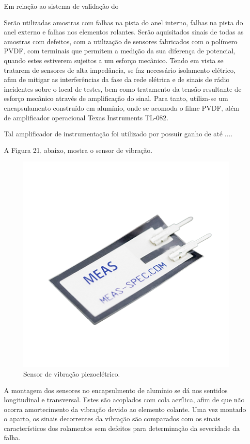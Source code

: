 \documentclass[
	12pt,				
	oneside,			
	a4paper,			
	english,			
	brazil				
	]{abntex2ppgsi}
\begin{document}
Em relação ao sistema de validação do 

Serão utilizadas amostras com falhas na pista do anel interno, falhas na pista do anel externo e falhas nos elementos rolantes. Serão aquisitados sinais de todas as amostras com defeitos, com a utilização de sensores fabricados com o polímero PVDF, com terminais que permitem a medição da sua diferença de potencial, quando estes estiverem sujeitos a um esforço mecânico. Tendo em vista se tratarem de sensores de alta impedância, se faz necessário isolamento elétrico, afim de mitigar as interferências da fase da rede elétrica e de sinais de rádio incidentes sobre o local de testes, bem como tratamento da tensão resultante de esforço mecânico através de amplificação do sinal. Para tanto, utiliza-se um encapsulamento construído em alumínio, onde se acomoda o filme PVDF, além de amplificador operacional Texas Instruments TL-082. 

Tal amplificador de instrumentação foi utilizado por possuir ganho de até .... 

A Figura 21, abaixo, mostra o sensor de vibração. 

\begin{figure}[!htb]
\centering
\includegraphics{Figura21}
\caption {Sensor de vibração piezoelétrico.}
\label{Figura21}
\end{figure} 

A montagem dos sensores no encapsulmento de alumínio se dá nos sentidos longitudinal e transversal. Estes são acoplados com cola acrílica, afim de que não ocorra amortecimento da vibração devido ao elemento colante. Uma vez montado o aparto, os sinais decorrentes da vibração são comparados com os sinais característicos dos rolamentos sem defeitos para determinação da severidade da falha.
\end{document}
